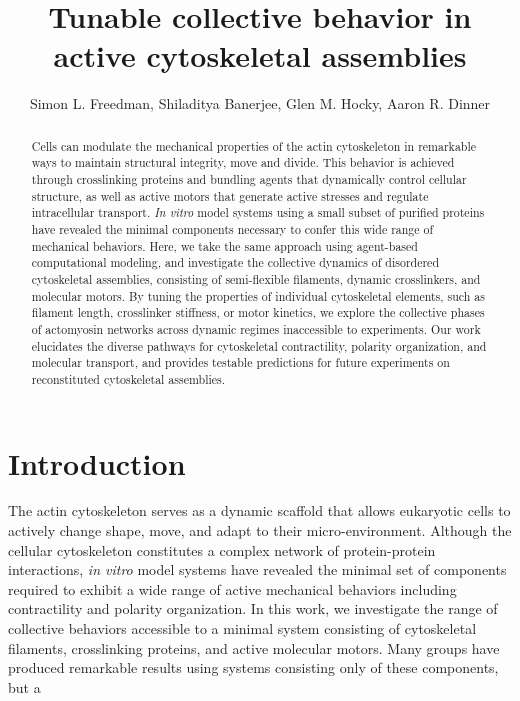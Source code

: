 \documentclass[12pt]{article} \usepackage{times} \usepackage{graphicx}
\begin{document}
 \title{Tunable collective behavior in active cytoskeletal
assemblies} \author{Simon L. Freedman, Shiladitya Banerjee, Glen M. Hocky,
Aaron R. Dinner} \date{} \maketitle \begin{abstract} Cells can modulate the
  mechanical properties of the actin cytoskeleton in remarkable ways to
  maintain structural integrity, move and divide. This behavior is achieved
  through crosslinking proteins and bundling agents that dynamically control
  cellular structure, as well as active motors that generate active stresses
  and regulate intracellular transport. {\em In vitro} model systems using a
  small subset of purified proteins have revealed the minimal components
  necessary to confer this wide range of mechanical behaviors. Here, we take
  the same approach using agent-based computational modeling, and investigate
  the collective dynamics of disordered cytoskeletal assemblies, consisting of
  semi-flexible filaments, dynamic crosslinkers, and molecular motors. By
  tuning the properties of individual cytoskeletal elements, such as filament
  length, crosslinker stiffness, or motor kinetics, we explore the collective
  phases of actomyosin networks across dynamic regimes inaccessible to
  experiments. Our work elucidates the diverse pathways for cytoskeletal
  contractility, polarity organization, and molecular transport, and provides
  testable predictions for future experiments on reconstituted cytoskeletal
  assemblies.  \end{abstract} \section{Introduction} The actin cytoskeleton
serves as a dynamic scaffold that allows eukaryotic cells to actively change
shape, move, and adapt to their micro-environment. Although the cellular
cytoskeleton constitutes a complex network of protein-protein interactions,
{\em in vitro} model systems have revealed the minimal set of components
required to exhibit a wide range of active mechanical behaviors including
contractility and polarity organization\cite{murrell2012,murrel2014,
takiguchi1991}. In this work, we investigate the range of collective behaviors
accessible to a minimal system consisting of cytoskeletal filaments,
crosslinking proteins, and active molecular motors. Many groups have produced
remarkable results using systems consisting only of these components, but a
\end{document}

